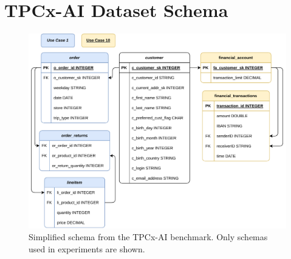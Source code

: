 \chapter{TPCx-AI Dataset Schema}

\begin{figure}[ht]
    \centering
    \includegraphics[width=0.99\linewidth]{appendices/figures/tpc-ai-schema.pdf}
    \caption[Simplified schema from the TPCx-AI \cite{tpcx-ai} benchmark]{Simplified schema from the TPCx-AI \cite{tpcx-ai} benchmark. Only schemas used in experiments are shown.}
    \label{fig:appendix-tpc-ai-schema}
\end{figure}